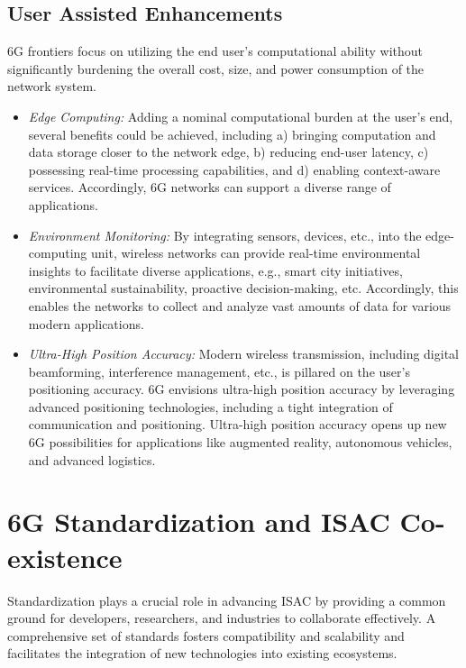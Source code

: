 \documentclass[journal, comsoc]{IEEEtran}
\begin{document}
\subsection{User Assisted Enhancements}
6G frontiers focus on utilizing the end user’s computational ability without significantly burdening the overall cost, size, and power consumption of the network system. 
\begin{itemize}
    \item \textit{Edge Computing:} Adding a nominal computational burden at the user’s end, several benefits could be achieved, including a) bringing computation and data storage closer to the network edge, b) reducing end-user latency, c) possessing real-time processing capabilities, and d) enabling context-aware services. Accordingly, 6G networks can support a diverse range of applications.

    \item \textit{Environment Monitoring:} By integrating sensors, devices, etc., into the edge-computing unit, wireless networks can provide real-time environmental insights to facilitate diverse applications, e.g., smart city initiatives, environmental sustainability, proactive decision-making, etc. Accordingly, this enables the networks to collect and analyze vast amounts of data for various modern applications.
    
    \item \textit{Ultra-High Position Accuracy:} Modern wireless transmission, including digital beamforming, interference management, etc., is pillared on the user’s positioning accuracy. 6G envisions ultra-high position accuracy by leveraging advanced positioning technologies, including a tight integration of communication and positioning. Ultra-high position accuracy opens up new 6G possibilities for applications like augmented reality, autonomous vehicles, and advanced logistics.
\end{itemize}

\section{6G Standardization and ISAC Co-existence}
\label{sec:3}

Standardization plays a crucial role in advancing ISAC by providing a common ground for developers, researchers, and industries to collaborate effectively. A comprehensive set of standards fosters compatibility and scalability and facilitates the integration of new technologies into existing ecosystems.
\end{document}
